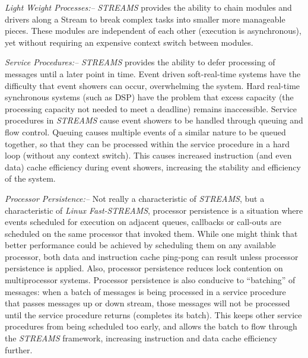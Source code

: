 \documentclass[letterpaper,final,notitlepage,twocolumn,10pt,twoside]{article}
\begin{document}
\begin{description}

\item{\it Light Weight Processes:--} {\sl STREAMS} provides the ability to chain
modules and drivers along a Stream to break complex tasks into smaller more
manageable pieces.  These modules are independent of each other (execution is
asynchronous), yet without requiring an expensive context switch between
modules.

\item{\it Service Procedures:--} {\sl STREAMS} provides the ability to defer
processing of messages until a later point in time.  Event driven soft-real-time
systems have the difficulty that event showers can occur, overwhelming the
system.  Hard real-time synchronous systems (such as DSP) have the problem that
excess capacity (the processing capacity not needed to meet a deadline) remains
inaccessible.  Service procedures in {\sl STREAMS} cause event showers to be
handled through queuing and flow control.  Queuing causes multiple events of a
similar nature to be queued together, so that they can be processed within the
service procedure in a hard loop (without any context switch).  This causes
increased instruction (and even data) cache efficiency during event showers,
increasing the stability and efficiency of the system.

\item{\it Processor Persistence:--} Not really a characteristic of {\sl
STREAMS}, but a characteristic of {\sl Linux Fast-STREAMS}, processor
persistence is a situation where events scheduled for execution on adjacent
queues, callbacks or call-outs are scheduled on the same processor that invoked
them.  While one might think that better performance could be achieved by
scheduling them on any available processor, both data and instruction cache
ping-pong can result unless processor persistence is applied.  Also, processor
persistence reduces lock contention on multiprocessor systems.  Processor
persistence is also conducive to ``batching'' of messages: when a batch of
messages is being processed in a service procedure that passes messages up or
down stream, those messages will not be processed until the service procedure
returns (completes its batch).  This keeps other service procedures from being
scheduled too early, and allows the batch to flow through the {\sl STREAMS}
framework, increasing instruction and data cache efficiency further.

\end{description}
\end{document}
